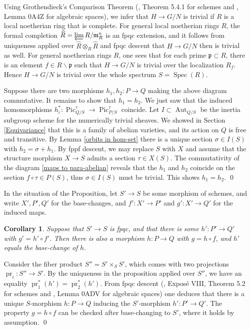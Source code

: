 \documentclass[oneside, 12pt]{amsart}
\newcommand\mylabel[1]{\label{#1}\marginpar{\raggedright\vspace{-1ex}\medskip\medskip\footnotesize \tt #1}}
\renewcommand\mylabel[1]{\label{#1}}
\newtheorem{corollary}[theorem]{Corollary}
\theoremstyle{definition}
\theoremstyle{remark}
\newcommand{\Aut}{\operatorname{Aut}}
\newcommand{\invlim}{\varprojlim}
\newcommand{\maxid}{\mathfrak{m}}
\newcommand{\primid}{\mathfrak{p}}
\newcommand{\Pic}{\operatorname{Pic}}
\newcommand{\pr}{\operatorname{pr}}
\newcommand{\ra}{\rightarrow}
\newcommand{\Spec}{\operatorname{Spec}}
\begin{document}
Using Grothendieck's Comparison Theorem (\cite{EGA IIIa}, Theorem 5.4.1 for schemes and \cite{SP},
Lemma 0A4Z for algebraic spaces), 
we infer that $H\ra G/N$ is trivial if $R$ is a     local
noetherian ring that is complete. For general local noetherian rings  $R$, the formal completion $ \widehat{R}=\invlim R/\maxid_R^n$ is an fpqc extension,
and it follows from uniqueness applied over $\widehat{R}\otimes_R\widehat{R}$ and  fpqc descent that $H\ra G/N$ then is trivial as well.
For general noetherian rings $R$, one sees that for each prime $\primid\subset R$, there is an element $f\in R\smallsetminus\primid$
such that $H\ra G/N$ is trivial over the localization $R_f$. Hence $H\ra G/N$ is trivial over the whole spectrum $S=\Spec(R)$.

Suppose there are two morphisms $h_1,h_2:P\ra Q$ making the above diagram commutative.
It remains to show that $h_1=h_2$. We just saw  that the induced homomorphisms
$h_i^*:\Pic^\tau_{Q/S}\ra\Pic^\tau_{P/S}$ coincide. Let $I\subset\Aut_{Q/S}$ be the inertia subgroup scheme
for the numerically trivial sheaves. We showed  in Section \ref{Equivariance} that this is a family of abelian varieties,
and its action on $Q$ is free and transitive. By Lemma \ref{orbits in hom-set} there is a unique section $\sigma\in I(S)$
with $h_2=\sigma+h_1$.
By fppf descent, we may replace $S$ with $X$ and assume that the structure morphism $X\ra S$
admits a section $\tau\in X(S)$. The commutativity of the diagram \eqref{maps to para-abelian} reveals that the 
$h_1$ and $h_2$ coincide on the section $f\circ \tau\in P(S)$, thus $\sigma\in I(S)$ must be trivial.
This shows $h_1=h_2$.
\qed

\medskip
In the situation of the Proposition, let  $S'\ra S$ be some   morphism of schemes, and write $X',P',Q'$
for the base-changes, and $f':X'\ra P'$  and $g':X'\ra Q'$ for the induced maps.

\begin{corollary}
\mylabel{morphism descends}
Suppose that $S'\ra S$ is fpqc, and that there is some $h':P'\ra Q'$  with $g'=h'\circ f'$. Then there is also a morphism $h:P\ra Q$ with $g=h\circ f$,
and $h'$ equals the base-change of $h$.
\end{corollary}

\proof
Consider the fiber product $S''=S'\times_SS'$, which comes with two projections $\pr_i:S''\ra S'$. By the uniqueness in the proposition applied over $S''$,
we have an equality $\pr_1^*(h')=\pr_2^*(h')$. From fpqc descent 
(\cite{SGA 1}, Expos\'e VIII, Theorem 5.2 for schemes and \cite{SP}, 
Lemma 0ADV for algebraic spaces)
one deduces that there is a unique $S$-morphism $h:P\ra Q$ inducing the $S'$-morphism $h':P'\ra Q'$.
The property $g=h\circ f$ can be checked after base-changing to $S'$, where it holds by assumption.
\qed
\end{document}
